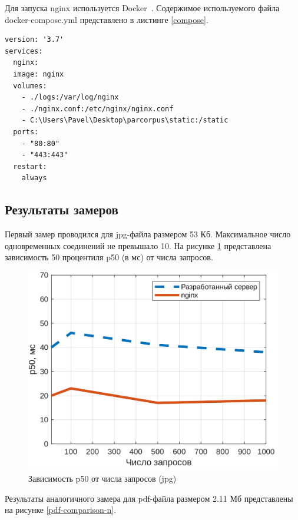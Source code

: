 Для запуска nginx используется Docker~\cite{docker}. Содержимое используемого файла docker-compose.yml представлено в листинге \ref{compose}.

\begin{lstlisting}[caption={Конфигурация docker-compose.yml}, label=compose]
version: '3.7'
services:  
  nginx:
  image: nginx
  volumes:
    - ./logs:/var/log/nginx
    - ./nginx.conf:/etc/nginx/nginx.conf
    - C:\Users\Pavel\Desktop\parcorpus\static:/static
  ports:
    - "80:80"
    - "443:443"
  restart:
    always
\end{lstlisting}

\subsection{Результаты замеров}

Первый замер проводился для jpg-файла размером 53 Кб. Максимальное число одновременных соединений не превышало 10. На рисунке \ref{jpg-comparison-n} представлена зависимость 50 процентиля p50 (в мс) от числа запросов.

\captionsetup{singlelinecheck = false, justification=centering}
\begin{figure}[H]
	\centering
	\includegraphics[scale=0.9]{img/jpg.jpg}
	\caption{Зависимость p50 от числа запросов (jpg)}
	\label{jpg-comparison-n}
\end{figure}

Результаты аналогичного замера для pdf-файла размером 2.11 Мб представлены на рисунке \ref{pdf-comparison-n}.

